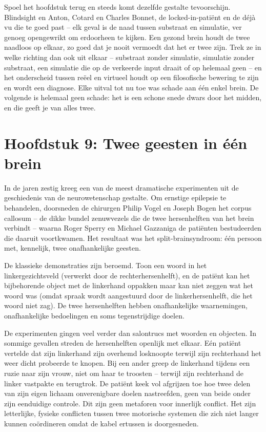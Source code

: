 \documentclass[11pt, twoside, openright]{book}
\begin{document}
Spoel het hoofdstuk terug en steeds komt dezelfde gestalte tevoorschijn. Blindsight en Anton, Cotard en Charles Bonnet, de locked-in-patiënt en de déjà vu die te goed past -- elk geval is de naad tussen substraat en simulatie, ver genoeg opengewrikt om erdoorheen te kijken. Een gezond brein houdt de twee naadloos op elkaar, zo goed dat je nooit vermoedt dat het er twee zijn. Trek ze in welke richting dan ook uit elkaar -- substraat zonder simulatie, simulatie zonder substraat, een simulatie die op de verkeerde input draait of op helemaal geen -- en het onderscheid tussen reëel en virtueel houdt op een filosofische bewering te zijn en wordt een diagnose. Elke uitval tot nu toe was schade aan één enkel brein. De volgende is helemaal geen schade: het is een schone snede dwars door het midden, en die geeft je van alles twee.


\chapter*{Hoofdstuk 9: Twee geesten in één brein}

In de jaren zestig kreeg een van de meest dramatische experimenten uit de geschiedenis van de neurowetenschap gestalte. Om ernstige epilepsie te behandelen, doorsneden de chirurgen Philip Vogel en Joseph Bogen het corpus callosum -- de dikke bundel zenuwvezels die de twee hersenhelften van het brein verbindt -- waarna Roger Sperry en Michael Gazzaniga de patiënten bestudeerden die daaruit voortkwamen. Het resultaat was het split-brainsyndroom: één persoon met, kennelijk, twee onafhankelijke geesten.

De klassieke demonstraties zijn beroemd. Toon een woord in het linkergezichtsveld (verwerkt door de rechterhersenhelft), en de patiënt kan het bijbehorende object met de linkerhand oppakken maar kan niet zeggen wat het woord was (omdat spraak wordt aangestuurd door de linkerhersenhelft, die het woord niet zag). De twee hersenhelften hebben onafhankelijke waarnemingen, onafhankelijke bedoelingen en soms tegenstrijdige doelen.

De experimenten gingen veel verder dan salontrucs met woorden en objecten. In sommige gevallen streden de hersenhelften openlijk met elkaar. Eén patiënt vertelde dat zijn linkerhand zijn overhemd losknoopte terwijl zijn rechterhand het weer dicht probeerde te knopen. Bij een ander greep de linkerhand tijdens een ruzie naar zijn vrouw, niet om haar te troosten -- terwijl zijn rechterhand de linker vastpakte en terugtrok. De patiënt keek vol afgrijzen toe hoe twee delen van zijn eigen lichaam onverenigbare doelen nastreefden, geen van beide onder zijn eenduidige controle. Dit zijn geen metaforen voor innerlijk conflict. Het zijn letterlijke, fysieke conflicten tussen twee motorische systemen die zich niet langer kunnen coördineren omdat de kabel ertussen is doorgesneden.
\end{document}
